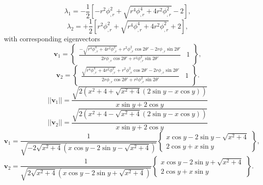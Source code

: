 \documentclass[12pt]{article}
\begin{document}
\begin{equation}
	\lambda_1 = - \frac{1}{2} \left[ - r^2 \phi_{,r}^2 + \sqrt{r^4 \phi_{,r}^4 + 4 r^2 \phi_{,r}^2} - 2 \right],
\end{equation}
\begin{equation}
	\lambda_2 = + \frac{1}{2} \left[ r^2 \phi_{,r}^2 + \sqrt{r^4 \phi_{,r}^4 + 4 r^2 \phi_{,r}^2} + 2 \right],
\end{equation}
with corresponding eigenvectors
\begin{equation}
	\mathbf{v}_1 = \left\{ \begin{array}{cc} \frac{-\sqrt{r^4 \phi_{,r}^4 + 4 r^2 \phi_{,r}^2} + r^2 \phi_{,r}^2 \cos 2 \theta' - 2 r \phi_{,r} \sin 2 \theta'}{2 r \phi_{,r} \cos 2 \theta' + r^2 \phi_{,r}^2 \sin 2 \theta'} & 1 \end{array} \right\},
\end{equation}
\begin{equation}
	\mathbf{v}_2 = \left\{ \begin{array}{cc} \frac{\sqrt{r^4 \phi_{,r}^4 + 4 r^2 \phi_{,r}^2} + r^2 \phi_{,r}^2 \cos 2 \theta' - 2 r \phi_{,r} \sin 2 \theta'}{2 r \phi_{,r} \cos 2 \theta' + r^2 \phi_{,r}^2 \sin 2 \theta'} & 1 \end{array} \right\}.
\end{equation}
\begin{equation}
	|| \mathbf{v}_1 || = \frac{\sqrt{2 (x^2 + 4 + \sqrt{x^2+4} (2 \sin y - x \cos y))}}{x \sin y + 2 \cos y}
\end{equation}
\begin{equation}
	|| \mathbf{v}_2 || = \frac{\sqrt{2 (x^2 + 4 - \sqrt{x^2+4} (2 \sin y - x \cos y))}}{x \sin y + 2 \cos y}
\end{equation}
\begin{equation}
	\mathbf{v}_1 = \frac{1}{\sqrt{- 2 \sqrt{x^2+4} (x \cos y - 2 \sin y - \sqrt{x^2+4})}} \left\{ \begin{array}{c} x \cos y - 2 \sin y - \sqrt{x^2 + 4} \\ 2 \cos y + x \sin y \end{array} \right\},
\end{equation}
\begin{equation}
	\mathbf{v}_2 = \frac{1}{\sqrt{2 \sqrt{x^2+4} (x \cos y - 2 \sin y + \sqrt{x^2+4})}} \left\{ \begin{array}{c} x \cos y - 2 \sin y + \sqrt{x^2 + 4} \\ 2 \cos y + x \sin y \end{array} \right\}.
\end{equation}
\end{document}
